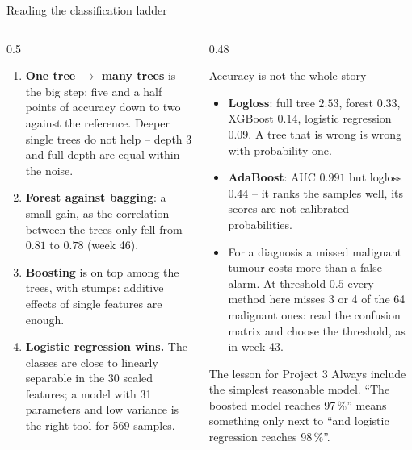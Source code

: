 \documentclass[10pt,aspectratio=169]{beamer}
\begin{document}
\begin{frame}{Reading the classification ladder}
\begin{columns}[T]
\begin{column}{0.5\textwidth}
\small
\begin{enumerate}
  \item \textbf{One tree $\to$ many trees} is the big step: five and a half
    points of accuracy down to two against the reference.  Deeper single
    trees do not help -- depth 3 and full depth are equal within the noise.
  \item \textbf{Forest against bagging}: a small gain, as the correlation
    between the trees only fell from $0.81$ to $0.78$ (week 46).
  \item \textbf{Boosting} is on top among the trees, with stumps:
    additive effects of single features are enough.
  \item \textbf{Logistic regression wins.}  The classes are close to
    linearly separable in the 30 scaled features; a model with 31 parameters
    and low variance is the right tool for 569 samples.
\end{enumerate}
\end{column}
\begin{column}{0.48\textwidth}
\small
\begin{block}{Accuracy is not the whole story}
\footnotesize
\begin{itemize}
  \item \textbf{Logloss}: full tree $2.53$, forest $0.33$, XGBoost $0.14$,
    logistic regression $0.09$.  A tree that is wrong is wrong with
    probability one.
  \item \textbf{AdaBoost}: AUC $0.991$ but logloss $0.44$ -- it ranks the
    samples well, its scores are not calibrated probabilities.
  \item For a diagnosis a missed malignant tumour costs more than a false
    alarm.  At threshold $0.5$ every method here misses 3 or 4 of the 64
    malignant ones: read the confusion matrix and choose the threshold, as
    in week 43.
\end{itemize}
\end{block}
\begin{block}{The lesson for Project 3}
\footnotesize
Always include the simplest reasonable model.  ``The boosted model reaches
97\,\%'' means something only next to ``and logistic regression reaches
98\,\%''.
\end{block}
\end{column}
\end{columns}
\end{frame}
\end{document}
